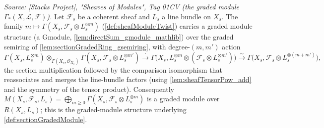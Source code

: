 \begin{lemma}
  \label{lem:sectionGradedModule_gmodule}
  \textit{Source: [Stacks Project], "Sheaves of Modules", Tag 01CV (the graded
  module \(\Gamma_*(X,\mathcal{L},\mathcal{F})\)).}
  Let \(\mathcal{F}_s\) be a coherent sheaf and \(L_s\) a line bundle on
  \(X_s\). The family
  \(m \mapsto \Gamma(X_s, \mathcal{F}_s \otimes L_s^{\otimes m})\)
  (\cref{def:sheafModuleTwist}) carries a graded module structure (a
  \(\mathrm{Gmodule}\), \cref{lem:directSum_gmodule_mathlib}) over the graded
  semiring of \cref{lem:sectionGradedRing_gsemiring}, with degree-\((m,m')\)
  action
  \[
    \Gamma(X_s, L_s^{\otimes m}) \otimes_{\Gamma(X_s,\mathcal{O}_{X_s})}
      \Gamma(X_s, \mathcal{F}_s \otimes L_s^{\otimes m'})
    \xrightarrow{\ \cdot\ }
    \Gamma\bigl(X_s, L_s^{\otimes m} \otimes
      (\mathcal{F}_s \otimes L_s^{\otimes m'})\bigr)
    \xrightarrow{\ \sim\ }
    \Gamma\bigl(X_s, \mathcal{F}_s \otimes L_s^{\otimes (m+m')}\bigr),
  \]
  the section multiplication followed by the comparison isomorphism that
  reassociates and merges the line-bundle factors (using
  \cref{lem:sheafTensorPow_add} and the symmetry of the tensor product).
  Consequently \(M(X_s, \mathcal{F}_s, L_s) = \bigoplus_{m \ge 0}
  \Gamma(X_s, \mathcal{F}_s \otimes L_s^{\otimes m})\) is a graded module over
  \(R(X_s, L_s)\); this is the graded-module structure underlying
  \cref{def:sectionGradedModule}.
\end{lemma}

